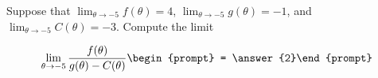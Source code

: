 \documentclass{ximera}
\author{Matthew Carr}
\begin{document}
\begin{exercise}
Suppose that $\lim_{\theta\to-5}f(\theta)=4$, $\lim_{\theta\to-5}g(\theta)=-1$, and $\lim_{\theta\to-5}C(\theta)=-3$. Compute the limit

\[
\lim_{\theta\to -5 } \frac{f(\theta)}{g(\theta)-C(\theta)}\begin{prompt} = \answer{2}\end{prompt}
\]
\end{exercise}
\end{document}
